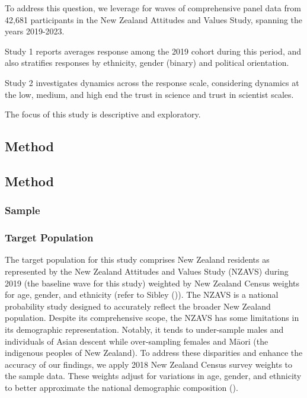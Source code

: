 \documentclass[
  single column]{article}
\begin{document}
To address this question, we leverage for waves of comprehensive panel
data from 42,681 participants in the New Zealand Attitudes and Values
Study, spanning the years 2019-2023.

Study 1 reports averages response among the 2019 cohort during this
period, and also stratifies responses by ethnicity, gender (binary) and
political orientation.

Study 2 investigates dynamics across the response scale, considering
dynamics at the low, medium, and high end the trust in science and trust
in scientist scales.

The focus of this study is descriptive and exploratory.

\subsection{Method}\label{method}

\subsection{Method}\label{method-1}

\subsubsection{Sample}\label{sample}

\subsubsection{Target Population}\label{target-population}

The target population for this study comprises New Zealand residents as
represented by the New Zealand Attitudes and Values Study (NZAVS) during
2019 (the baseline wave for this study) weighted by New Zealand Census
weights for age, gender, and ethnicity (refer to Sibley
()). The NZAVS is a national probability
study designed to accurately reflect the broader New Zealand population.
Despite its comprehensive scope, the NZAVS has some limitations in its
demographic representation. Notably, it tends to under-sample males and
individuals of Asian descent while over-sampling females and Māori (the
indigenous peoples of New Zealand). To address these disparities and
enhance the accuracy of our findings, we apply 2018 New Zealand Census
survey weights to the sample data. These weights adjust for variations
in age, gender, and ethnicity to better approximate the national
demographic composition ().
\end{document}
